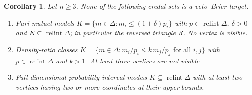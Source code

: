 \documentclass[11pt]{article}
\DeclareMathOperator{\relint}{relint}
\theoremstyle{plain}
\newtheorem{corollary}[theorem]{Corollary}
\theoremstyle{definition}
\theoremstyle{remark}
\begin{document}
\begin{corollary}\label{cor:out}
Let $n\ge3$. None of the following credal sets is a veto--Brier target.
\begin{enumerate}[label=(\alph*)]
  \item \emph{Pari-mutuel models} $K=\{m\in\Delta:m_i\le(1+\delta)p_i\}$ with
  $p\in\relint\Delta$, $\delta>0$ and $K\subseteq\relint\Delta$; in particular the reversed
  triangle $R$. No vertex is visible.
  \item \emph{Density-ratio classes} $K=\{m\in\Delta:m_i/p_i\le k\,m_j/p_j\text{ for all
  }i,j\}$ with $p\in\relint\Delta$ and $k>1$. At least three vertices are not visible.
  \item Full-dimensional probability-interval models $K\subseteq\relint\Delta$ with at
  least two vertices having two or more coordinates at their upper bounds.
\end{enumerate}
\end{corollary}
\end{document}
